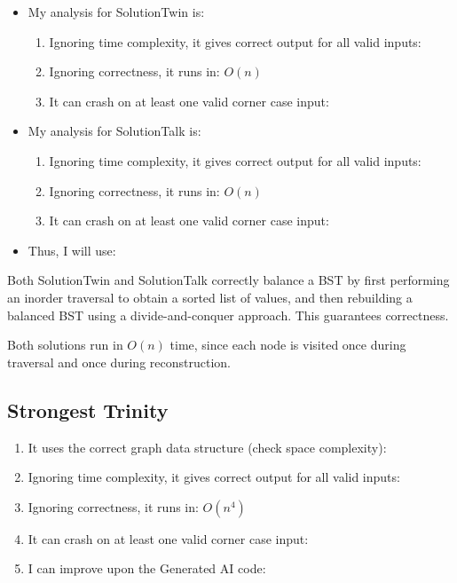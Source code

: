 \documentclass[12pt]{article}
\begin{document}
\begin{itemize}
\item My analysis for SolutionTwin is:
\begin{enumerate}
\item Ignoring time complexity, it gives correct output for all valid inputs: 
\item Ignoring correctness, it runs in: $\boxed{O\left(n\right)}$
\item It can crash on at least one valid corner case input: 
\end{enumerate}
\item My analysis for SolutionTalk is:
\begin{enumerate}
\item Ignoring time complexity, it gives correct output for all valid inputs: 
\item Ignoring correctness, it runs in: $\boxed{O\left(n\right)}$
\item It can crash on at least one valid corner case input: 
\end{enumerate}
\item Thus, I will use: 
\end{itemize}

Both SolutionTwin and SolutionTalk correctly balance a BST by first performing an inorder traversal to obtain a sorted list of values, and then rebuilding a balanced BST using a divide-and-conquer approach. This guarantees correctness.

Both solutions run in $O(n)$ time, since each node is visited once during traversal and once during reconstruction.
\newpage
\subsection{Strongest Trinity}
\begin{enumerate}
\item It uses the correct graph data structure (check space complexity): 
\item Ignoring time complexity, it gives correct output for all valid inputs: 
\item Ignoring correctness, it runs in: $\boxed{O\left(n^4\right)}$
\item It can crash on at least one valid corner case input: 
\item I can improve upon the Generated AI code: 
\end{enumerate}
\end{document}
